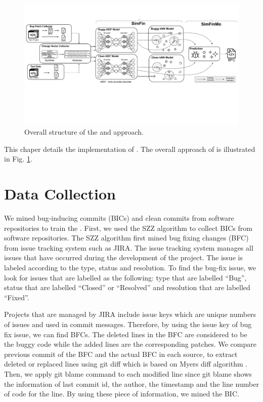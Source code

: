 \begin{figure}[!tbp]
\renewcommand{\arraystretch}{1}
    \centering
    \includegraphics[width=\textwidth]{figures/approach_fig.pdf}\hfill
    \caption{Overall structure of the {\simfin} and {\simfinmo} approach.}
    \label{fig:approach}
\end{figure}
    
     

This chaper details the implementation of {\simfinmo}.
The overall approach of {\simfinmo} is illustrated in Fig. \ref{fig:approach}.

\section{Data Collection}
We mined bug-inducing commits (BICs) and clean commits from software repositories to train the {\simfin}.
First, we used the SZZ algorithm \cite{sliwerski2005changes} to collect BICs from software repositories. 
The SZZ algorithm first mined bug fixing changes (BFC) from issue tracking system such as JIRA.
The issue tracking system manages all issues that have occurred during the development of the project.
The issue is labeled according to the type, status and resolution.
To find the bug-fix issue, we look for issues that are labelled as the following: type that are labelled ``Bug'', status that are labelled ``Closed'' or ``Resolved'' and resolution that are labelled ``Fixed''.

Projects that are managed by JIRA include issue keys which are unique numbers of issues and used in commit messages.
Therefore, by using the issue key of bug fix issue, we can find BFCs.
The deleted lines in the BFC are considered to be the buggy code while the added lines are the corresponding patches.
We compare previous commit of the BFC and the actual BFC in each source, to extract deleted or replaced lines using git diff which is based on Myers diff algorithm \cite{myers1986ano}.
Then, we apply git blame command to each modified line since git blame shows the information of last commit id, the author, the timestamp and the line number of code for the line.
By using these piece of information, we mined the BIC.

